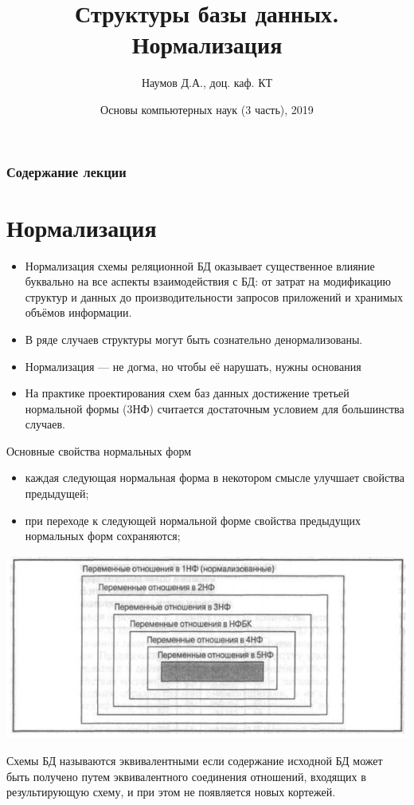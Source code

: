 \documentclass{beamer}
\title[СУБД]{Структуры базы данных. Нормализация}
\author{Наумов Д.А., доц. каф. КТ}
\date[22.03.2019] {Основы компьютерных наук (3 часть), 2019}
\begin{document}
\begin{frame}
  \titlepage
\end{frame}
  
\begin{frame}
  \frametitle{Содержание лекции}
  \tableofcontents  
\end{frame}
  
\section{Нормализация}
\begin{frame}
\begin{itemize}
\item Нормализация схемы реляционной БД оказывает существенное влияние буквально на все аспекты взаимодействия с БД: от затрат на модификацию структур и данных до производительности запросов приложений и хранимых объёмов информации. 
\item В ряде случаев структуры могут быть сознательно  денормализованы.
\item Нормализация — не догма, но чтобы её нарушать, нужны основания
\item На практике проектирования схем баз данных достижение третьей нормальной формы (3НФ) считается достаточным условием для большинства случаев.
\end{itemize}
\end{frame} 

\begin{frame}
\begin{block}{Основные свойства нормальных форм}
\begin{itemize}
\item каждая следующая нормальная форма в некотором смысле улучшает свойства предыдущей;
\item при переходе к следующей нормальной форме свойства предыдущих нормальных форм сохраняются;
\end{itemize}
\end{block}

\begin{center}
\includegraphics[scale=0.4]{images/forms.png}
\end{center}

\begin{block}{Схемы БД называются эквивалентными}
если содержание исходной БД может быть получено путем эквивалентного соединения отношений, входящих в результирующую схему, и при этом не появляется новых кортежей.
\end{block}
\end{frame} 
\end{document}
